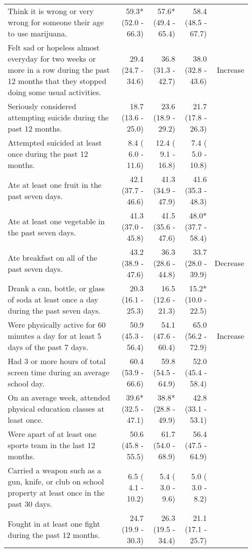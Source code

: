 \documentclass[11pt]{article}
\begin{document}
\begin{longtable}{p{12cm}|rrr|r}
  Think it is wrong or very wrong for someone their age to use marijuana. & 59.3*(52.0 - 66.3) & 57.6*(49.4 - 65.4) & 58.4 (48.5 - 67.7) &  \\ 
  Felt sad or hopeless almost everyday for two weeks or more in a row during the past 12 months that they stopped doing some usual activities. & 29.4 (24.7 - 34.6) & 36.8 (31.3 - 42.7) & 38.0 (32.8 - 43.6) & Increase \\ 
  Seriously considered attempting suicide during the past 12 months. & 18.7 (13.6 - 25.0) & 23.6 (18.9 - 29.2) & 21.7 (17.8 - 26.3) &  \\ 
  Attempted suicided at least once during the past 12 months. &  8.4 ( 6.0 - 11.6) & 12.4 ( 9.1 - 16.8) &  7.4 ( 5.0 - 10.8) &  \\ 
  Ate at least one fruit in the past seven days.  & 42.1 (37.7 - 46.6) & 41.3 (34.9 - 47.9) & 41.6 (35.3 - 48.3) &  \\ 
  Ate at least one vegetable in the past seven days.  & 41.3 (37.0 - 45.8) & 41.5 (35.6 - 47.6) & 48.0*(37.7 - 58.4) &  \\ 
  Ate breakfast on all of the past seven days. & 43.2 (38.9 - 47.6) & 36.3 (28.6 - 44.8) & 33.7 (28.0 - 39.9) & Decrease \\ 
  Drank a can, bottle, or glass of soda at least once a day during the past seven days. & 20.3 (16.1 - 25.3) & 16.5 (12.6 - 21.3) & 15.2*(10.0 - 22.5) &  \\ 
  Were physically active for 60 minutes a day for at least 5 days of the past 7 days. & 50.9 (45.3 - 56.4) & 54.1 (47.6 - 60.4) & 65.0 (56.2 - 72.9) & Increase \\ 
  Had 3 or more hours of total screen time during an average school day. & 60.4 (53.9 - 66.6) & 59.8 (54.5 - 64.9) & 52.0 (45.4 - 58.4) &  \\ 
  On an average week, attended physical education classes at least once. & 39.6*(32.5 - 47.1) & 38.8*(28.8 - 49.9) & 42.8 (33.1 - 53.1) &  \\ 
  Were apart of at least one sports team in the last 12 months. & 50.6 (45.8 - 55.5) & 61.7 (54.0 - 68.9) & 56.4 (47.5 - 64.9) &  \\ 
  Carried a weapon such as a gun, knife, or club on school property at least once in the past 30 days. &  6.5 ( 4.1 - 10.2) &  5.4 ( 3.0 -  9.6) &  5.0 ( 3.0 -  8.2) &  \\ 
  Fought in at least one fight during the past 12 months. & 24.7 (19.9 - 30.3) & 26.3 (19.5 - 34.4) & 21.1 (17.1 - 25.7) &  \\ 

\end{longtable}
\end{document}
